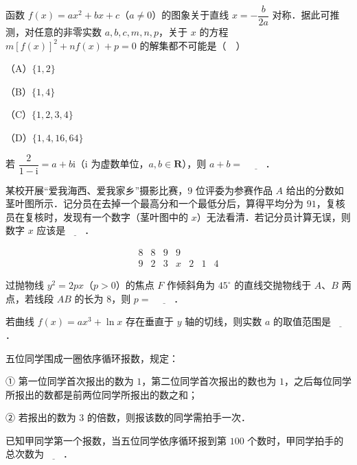 \begin{question}
函数 $f(x)=ax^2+bx+c$（$a\neq0$）的图象关于直线 $x=-\dfrac b{2a}$ 对称．据此可推测，对任意的非零实数 $a,b,c,m,n,p$，关于 $x$ 的方程 $m[f(x)]^2+nf(x)+p=0$ 的解集都不可能是（　）

（A）$\{1,2\}$

（B）$\{1,4\}$

（C）$\{1,2,3,4\}$

（D）$\{1,4,16,64\}$

\end{question}

\begin{question}
若 $\dfrac2{1-\mathrm i}=a+b\mathrm i$（$\mathrm i$ 为虚数单位，$a,b\in\mathbf R$），则 $a+b=$ $\underline{\qquad}$．

\end{question}
\begin{question}
某校开展“爱我海西、爱我家乡”摄影比赛，$9$ 位评委为参赛作品 $A$ 给出的分数如茎叶图所示．记分员在去掉一个最高分和一个最低分后，算得平均分为 $91$，复核员在复核时，发现有一个数字（茎叶图中的 $x$）无法看清．若记分员计算无误，则数字 $x$ 应该是$\underline{\qquad}$．

\nopagebreak[4]
\[\begin{array}{c|cccccc}
8&8&9&9&&&\\
9&2&3&x&2&1&4
\end{array}\]

\end{question}
\begin{question}
过抛物线 $y^2=2px$（$p>0$）的焦点 $F$ 作倾斜角为 $45^\circ$ 的直线交抛物线于 $A$、$B$ 两点，若线段 $AB$ 的长为 $8$，则 $p=$ $\underline{\qquad}$．

\end{question}
\begin{question}
若曲线 $f(x)=ax^3+\ln x$ 存在垂直于 $y$ 轴的切线，则实数 $a$ 的取值范围是$\underline{\qquad}$．

\end{question}
\begin{question}
五位同学围成一圈依序循环报数，规定：

① 第一位同学首次报出的数为 $1$，第二位同学首次报出的数也为 $1$，之后每位同学所报出的数都是前两位同学所报出的数之和；

② 若报出的数为 $3$ 的倍数，则报该数的同学需拍手一次．

已知甲同学第一个报数，当五位同学依序循环报到第 $100$ 个数时，甲同学拍手的总次数为$\underline{\qquad}$．

\end{question}


